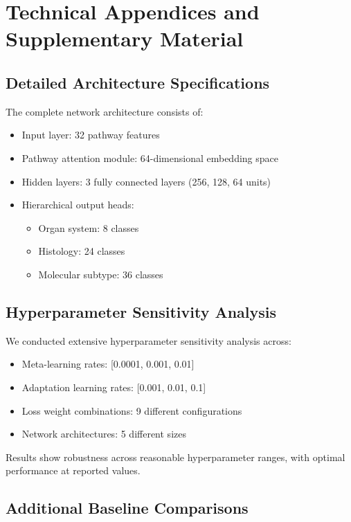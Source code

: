 \documentclass{article}
\begin{document}
\appendix
\section{Technical Appendices and Supplementary Material}

\subsection{Detailed Architecture Specifications}

The complete network architecture consists of:
\begin{itemize}
\item Input layer: 32 pathway features
\item Pathway attention module: 64-dimensional embedding space
\item Hidden layers: 3 fully connected layers (256, 128, 64 units)
\item Hierarchical output heads: 
  \begin{itemize}
    \item Organ system: 8 classes
    \item Histology: 24 classes  
    \item Molecular subtype: 36 classes
  \end{itemize}
\end{itemize}

\subsection{Hyperparameter Sensitivity Analysis}

We conducted extensive hyperparameter sensitivity analysis across:
\begin{itemize}
\item Meta-learning rates: [0.0001, 0.001, 0.01]
\item Adaptation learning rates: [0.001, 0.01, 0.1]
\item Loss weight combinations: 9 different configurations
\item Network architectures: 5 different sizes
\end{itemize}

Results show robustness across reasonable hyperparameter ranges, with optimal performance at reported values.

\subsection{Additional Baseline Comparisons}
\end{document}
